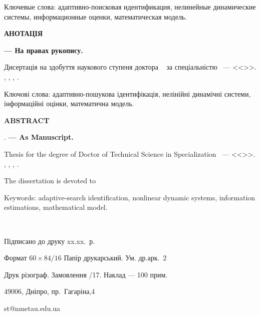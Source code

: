 \documentclass[a4paper,13pt]{atuaref}
\newcommand{\xsect}[1]{\medskip\begin{center}\textbf{#1}\end{center}\medskip\penalty10000}
\begin{document}
Ключевые слова:
адаптивно-поисковая идентификация, нелинейные динамические системы,
информационные оценки, математическая модель.


\xsect{АНОТАЦІЯ}

\textbf{\dissauthorUa}
\textbf{\booknameUa}
\textbf{--- На правах рукопису.}

Дисертація на здобуття наукового ступеня
доктора
\dissScopeUa\ {}
за спеціальністю
\dissSpecId\ --- <<\dissSpecUa>>.
\institutionUa, \belongUa, \cityUa, \bookyear.


Ключові слова: адаптивно-пошукова ідентифікація, нелінійні динамічні
системи, інформаційні оцінки, математична модель.



\xsect{ABSTRACT}

\textbf{\dissauthorEn}
\textbf{\booknameEn}.
\textbf{--- As Manuscript.}

Thesis for the degree of Doctor of Technical Science in Specialization
\dissSpecId\ --- <<\dissSpecEn>>.
\institutionEn, \belongEn, \cityEn, \bookyear.

The dissertation is devoted to

Keywords: adaptive-search identification, nonlinear dynamic systems,
information estimations, mathematical model.

\clearpage

{~}
\vfill

\begin{center}


Підписано до друку xx.xx.\bookyear~р.

Формат $60 \times 84/16$  Папір друкарський. Ум. др.арк.~2

Друк різограф. Замовлення /17. Наклад --- 100 прим.


49006, Дніпро, пр.~Гагаріна,4

st@nmetau.edu.ua

\end{center}

\vfill
\end{document}
